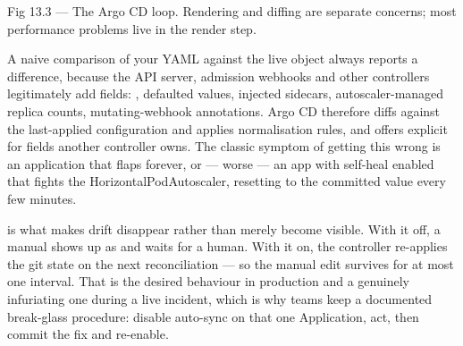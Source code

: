 \begin{wbfigure}{Fig 13.3 — The Argo CD loop. Rendering and diffing are separate concerns; most performance problems live in the render step.}
\end{wbfigure}

 A naive comparison of your YAML against the live object always reports a difference, because the API server, admission webhooks and other controllers legitimately add fields: , defaulted values, injected sidecars, autoscaler-managed replica counts, mutating-webhook annotations. Argo CD therefore diffs against the last-applied configuration and applies normalisation rules, and offers explicit  for fields another controller owns. The classic symptom of getting this wrong is an application that flaps  forever, or --- worse --- an app with self-heal enabled that fights the HorizontalPodAutoscaler, resetting  to the committed value every few minutes.

\begin{behind}
 is what makes drift disappear rather than merely become visible. With it off, a manual  shows up as  and waits for a human. With it on, the controller re-applies the git state on the next reconciliation --- so the manual edit survives for at most one interval. That is the desired behaviour in production and a genuinely infuriating one during a live incident, which is why teams keep a documented break-glass procedure: disable auto-sync on that one Application, act, then commit the fix and re-enable.
\end{behind}

